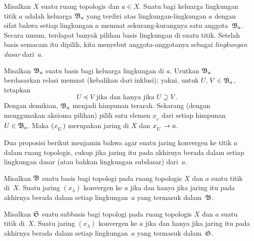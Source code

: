 \begin{exam}\label{C031429} Misalkan $X$ suatu ruang topologis dan $a \in X$. Suatu
 bagi keluarga lingkungan titik $a$ adalah keluarga $\mathfrak{B}_a$ yang terdiri atas
lingkungan-lingkungan $a$ dengan sifat bahwa setiap lingkungan $a$ memuat sekurang-kurangnya
satu anggota~$\mathfrak{B}_a$. Secara umum, terdapat banyak pilihan basis lingkungan di
suatu titik. Setelah basis semacam itu dipilih, kita menyebut anggota-anggotanya sebagai
\emph{lingkungan dasar} dari~$a$.

Misalkan $\mathfrak{B}_a$ suatu basis bagi keluarga lingkungan di $a$. Urutkan $\mathfrak{B}_a$ berdasarkan
relasi memuat (kebalikan dari inklusi); yakni, untuk $U$, $V \in \mathfrak{B}_a$, tetapkan
  \[ U \preceq V \text{ jika dan hanya jika } U \supseteq V\,. \]
Dengan demikian, $\mathfrak{B}_a$ menjadi himpunan terarah. Sekarang (dengan menggunakan aksioma pilihan) pilih satu
elemen $x_{{}_U}$ dari setiap himpunan $U \in \mathfrak{B}_a$. Maka $(x_{{}_{\scriptstyle{U}}})$ merupakan jaring di $X$
dan $x_{{}_{\scriptstyle{U}}} \rightarrow a$.
\end{exam}

Dua proposisi berikut menjamin bahwa agar suatu jaring konvergen ke titik $a$ dalam
ruang topologis, cukup jika jaring itu pada akhirnya berada dalam setiap lingkungan dasar (atau bahkan
lingkungan subdasar) dari~$a$.

\begin{prop}\label{C031431} Misalkan $\mathfrak{B}$ suatu basis bagi topologi pada ruang topologis
$X$ dan $a$ suatu titik di~$X$. Suatu jaring $(x_\lambda)$ konvergen ke $a$ jika dan hanya
jika jaring itu pada akhirnya berada dalam setiap lingkungan~$a$ yang termasuk dalam~$\mathfrak{B}$.
\end{prop}

\begin{prop}\label{C031434} Misalkan $\mathfrak{S}$ suatu subbasis bagi topologi pada ruang topologis
$X$ dan $a$ suatu titik di~$X$. Suatu jaring $(x_\lambda)$ konvergen ke $a$ jika dan hanya jika
jaring itu pada akhirnya berada dalam setiap lingkungan~$a$ yang termasuk dalam~$\mathfrak{S}$.
\end{prop}

